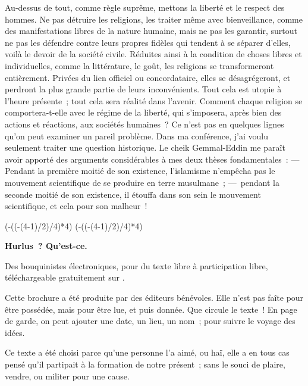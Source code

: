\documentclass[french,twoside]{book} %
\newcommand\persName[1]{#1}
\def\truncdiv#1#2{((#1-(#2-1)/2)/#2)}
\def\moduloop#1#2{(#1-\truncdiv{#1}{#2}*#2)}
\def\modulo#1#2{\number\numexpr\moduloop{#1}{#2}\relax}
\begin{document}
Au-dessus de tout, comme règle suprême, mettons la liberté et le respect des hommes. Ne pas détruire les religions, les traiter même avec bienveillance, comme des manifestations libres de la nature humaine, mais ne pas les garantir, surtout ne pas les défendre contre leurs propres fidèles qui tendent à se séparer d’elles, voilà le devoir de la société civile. Réduites ainsi à la condition de choses libres et individuelles, comme la littérature, le goût, les religions se transformeront entièrement. Privées du lien officiel ou concordataire, elles se désagrégeront, et perdront la plus grande partie de leurs inconvénients. Tout cela est utopie à l’heure présente ; tout cela sera réalité dans l’avenir. Comment chaque religion se comportera-t-elle avec le régime de la liberté, qui s’imposera, après bien des actions et réactions, aux sociétés humaines ? Ce n’est pas en quelques lignes qu’on peut examiner un pareil problème. Dans ma conférence, j’ai voulu seulement traiter une question historique. Le {\persName cheik Gemmal-Eddin} me paraît avoir apporté des arguments considérables à mes deux thèses fondamentales : — Pendant la première moitié de son existence, l’islamisme n’empêcha pas le mouvement scientifique de se produire en terre musulmane ; — pendant la seconde moitié de son existence, il étouffa dans son sein le mouvement scientifique, et cela pour son malheur !
 


\ifbooklet
  \pagestyle{empty}
  \clearpage
  \ifnum\modulo{\value{page}}{4}=0 \hbox{}\newpage\hbox{}\newpage\fi
  \ifnum\modulo{\value{page}}{4}=1 \hbox{}\newpage\hbox{}\newpage\fi


  \hbox{}\newpage
  \ifodd\value{page}\hbox{}\newpage\fi
  {\centering\color{rubric}\bfseries\noindent\large
    Hurlus ? Qu’est-ce.\par
    \bigskip
  }
  \noindent Des bouquinistes électroniques, pour du texte libre à participation libre,
  téléchargeable gratuitement sur \href{https://hurlus.fr}{}.\par
  \bigskip
  \noindent Cette brochure a été produite par des éditeurs bénévoles.
  Elle n’est pas faîte pour être possédée, mais pour être lue, et puis donnée.
  Que circule le texte !
  En page de garde, on peut ajouter une date, un lieu, un nom ; pour suivre le voyage des idées.
  \par

  Ce texte a été choisi parce qu’une personne l’a aimé,
  ou haï, elle a en tous cas pensé qu’il partipait à la formation de notre présent ;
  sans le souci de plaire, vendre, ou militer pour une cause.
  \par
\end{document}
